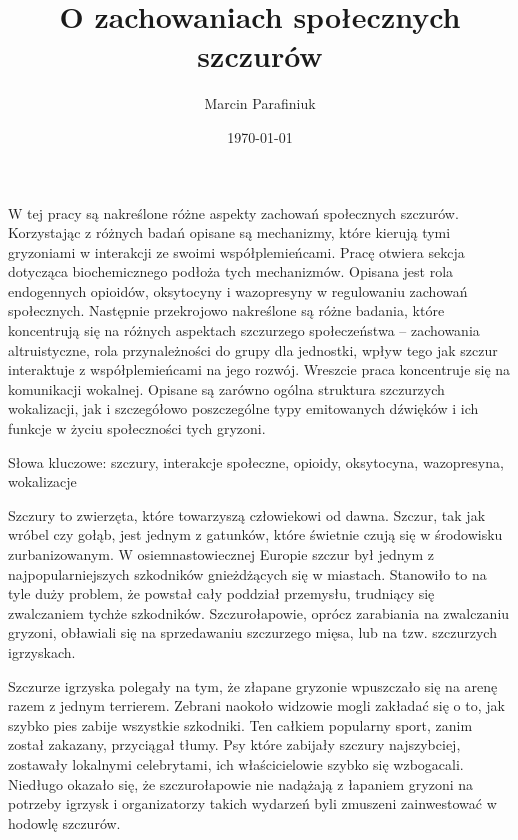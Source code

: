 \documentclass{psychol}
\title{O zachowaniach społecznych szczurów}
\author{Marcin Parafiniuk}
\date{\today}
\begin{document}
\maketitle
\tableofcontents
\doublespacing

\pagebreak


W tej pracy są nakreślone różne aspekty zachowań społecznych szczurów. Korzystając z różnych badań \colorbox{yellow!30}{opisane są} mechanizmy, które kierują tymi gryzoniami w interakcji ze swoimi współplemieńcami. \colorbox{yellow!30}{Pracę otwiera sekcja} dotycząca biochemicznego podłoża tych mechanizmów. \colorbox{yellow!30}{Opisana jest} rola endogennych opioidów, oksytocyny i wazopresyny w regulowaniu zachowań społecznych. Następnie przekrojowo \colorbox{yellow!30}{nakreślone są} różne badania, które koncentrują się na różnych aspektach szczurzego społeczeństwa -- zachowania altruistyczne, rola przynależności do grupy dla jednostki, wpływ tego jak szczur interaktuje z współplemieńcami na jego rozwój. Wreszcie \colorbox{yellow!30}{praca koncentruje się} na komunikacji \colorbox{yellow!30}{wokalnej}. \colorbox{yellow!30}{Opisane są} zarówno ogólna struktura szczurzych wokalizacji, jak i szczegółowo poszczególne typy emitowanych dźwięków i ich funkcje w życiu społeczności tych gryzoni.

Słowa kluczowe: szczury, interakcje społeczne, opioidy, oksytocyna, wazopresyna, wokalizacje


Szczury to zwierzęta, które towarzyszą człowiekowi od dawna. Szczur, tak jak wróbel czy gołąb, jest jednym z gatunków, które świetnie czują się w środowisku zurbanizowanym. W osiemnastowiecznej Europie szczur był jednym z najpopularniejszych szkodników gnieżdżących się w miastach. Stanowiło to na tyle duży problem, że powstał cały poddział przemysłu, trudniący się zwalczaniem tychże szkodników. Szczurołapowie, oprócz zarabiania na zwalczaniu gryzoni, obławiali się na sprzedawaniu szczurzego mięsa, lub na tzw. szczurzych igrzyskach.

Szczurze igrzyska polegały na tym, że złapane gryzonie wpuszczało się na arenę razem z jednym terrierem. Zebrani naokoło widzowie mogli zakładać się o to, jak szybko pies zabije wszystkie szkodniki. Ten całkiem popularny sport, zanim został zakazany, przyciągał tłumy. Psy które zabijały szczury najszybciej, zostawały lokalnymi celebrytami, ich właścicielowie szybko się wzbogacali. Niedługo okazało się, że szczurołapowie nie nadążają z łapaniem gryzoni na potrzeby igrzysk i organizatorzy takich wydarzeń byli zmuszeni zainwestować w hodowlę szczurów.
\end{document}
